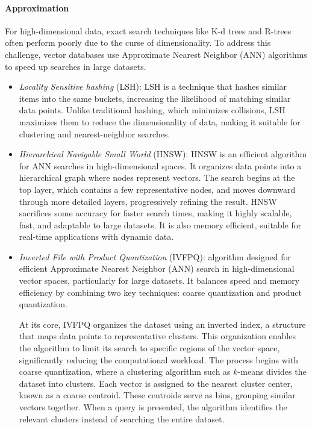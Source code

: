 \paragraph*{Approximation}
For high-dimensional data, exact search techniques like K-d trees and R-trees often perform poorly due to the curse of dimensionality.
To address this challenge, vector databases use Approximate Nearest Neighbor (ANN) algorithms to speed up searches in large datasets.
\begin{itemize}
    \item \textit{Locality Sensitive hashing} (LSH):  LSH is a technique that hashes similar items into the same buckets, increasing the likelihood of matching similar data points. 
        Unlike traditional hashing, which minimizes collisions, LSH maximizes them to reduce the dimensionality of data, making it suitable for clustering and nearest-neighbor searches.
    \item \textit{Hierarchical Navigable Small World} (HNSW): HNSW is an efficient algorithm for ANN searches in high-dimensional spaces. 
        It organizes data points into a hierarchical graph where nodes represent vectors. 
        The search begins at the top layer, which contains a few representative nodes, and moves downward through more detailed layers, progressively refining the result. 
        HNSW sacrifices some accuracy for faster search times, making it highly scalable, fast, and adaptable to large datasets. 
        It is also memory efficient, suitable for real-time applications with dynamic data.
    \item \textit{Inverted File with Product Quantization} (IVFPQ): algorithm designed for efficient 
        Approximate Nearest Neighbor (ANN) search in high-dimensional vector spaces, particularly for large datasets. 
        It balances speed and memory efficiency by combining two key techniques: coarse quantization and product quantization.

        At its core, IVFPQ organizes the dataset using an inverted index, a structure that maps data points to representative clusters. 
        This organization enables the algorithm to limit its search to specific regions of the vector space, significantly reducing the computational workload. 
        The process begins with coarse quantization, where a clustering algorithm such as $k$-means divides the dataset into clusters. 
        Each vector is assigned to the nearest cluster center, known as a coarse centroid. 
        These centroids serve as bins, grouping similar vectors together. When a query is presented, the algorithm identifies the relevant clusters instead of searching the entire dataset.


\end{itemize}
